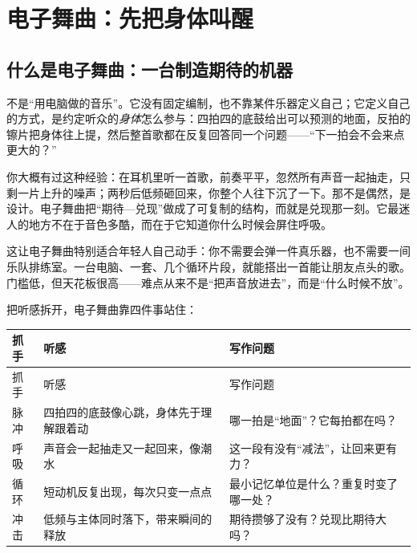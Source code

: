 \chapter{电子舞曲：先把身体叫醒}
\label{ch:genre-edm-deep}


\section{什么是电子舞曲：一台制造期待的机器}
\label{sec:edm-what}

不是“用电脑做的音乐”。它没有固定编制，也不靠某件乐器定义自己；它定义自己的方式，是约定听众的\emph{身体}怎么参与：四拍四的底鼓给出可以预测的地面，反拍的镲片把身体往上提，然后整首歌都在反复回答同一个问题——“下一拍会不会来点更大的？”

你大概有过这种经验：在耳机里听一首歌，前奏平平，忽然所有声音一起抽走，只剩一片上升的噪声；两秒后低频砸回来，你整个人往下沉了一下。那不是偶然，是设计。电子舞曲把“期待—兑现”做成了可复制的结构，而就是兑现那一刻。它最迷人的地方不在于音色多酷，而在于它知道你什么时候会屏住呼吸。

这让电子舞曲特别适合年轻人自己动手：你不需要会弹一件真乐器，也不需要一间乐队排练室。一台电脑、一套、几个循环片段，就能搭出一首能让朋友点头的歌。门槛低，但天花板很高——难点从来不是“把声音放进去”，而是“什么时候不放”。

把听感拆开，电子舞曲靠四件事站住：

\begin{longtable}{p{}p{}p{}}
\toprule
抓手 & 听感 & 写作问题 \\
\midrule
\endfirsthead
\toprule
抓手 & 听感 & 写作问题 \\
\midrule
\endhead
脉冲 & 四拍四的底鼓像心跳，身体先于理解跟着动 & 哪一拍是“地面”？它每拍都在吗？ \\
呼吸 & 声音会一起抽走又一起回来，像潮水 & 这一段有没有“减法”，让回来更有力？ \\
循环 & 短动机反复出现，每次只变一点点 & 最小记忆单位是什么？重复时变了哪一处？ \\
冲击 & 低频与主体同时落下，带来瞬间的释放 & 期待攒够了没有？兑现比期待大吗？ \\
\bottomrule
\end{longtable}

